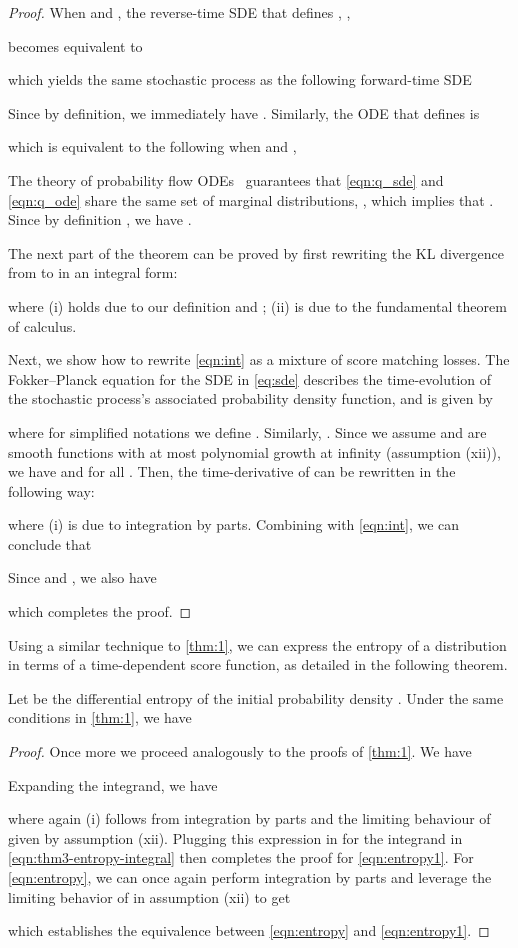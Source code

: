 \thm*
\begin{proof}
When  and , the reverse-time SDE that defines , \ie,

becomes equivalent to

which yields the same stochastic process as the following forward-time SDE

Since  by definition, we immediately have . Similarly, the ODE that defines  is

which is equivalent to the following when  and ,

The theory of probability flow ODEs~\cite{song2020score} guarantees that \cref{eqn:q_sde} and \cref{eqn:q_ode} share the same set of marginal distributions, , which implies that . Since by definition , we have .

The next part of the theorem can be proved by first rewriting the KL divergence from  to  in an integral form:

where (i) holds due to our definition  and ; (ii) is due to the fundamental theorem of calculus.

Next, we show how to rewrite \cref{eqn:int} as a mixture of score matching losses. 
The Fokker--Planck equation for the SDE in \cref{eq:sde} describes the time-evolution of the stochastic process's associated probability density function, and is given by

where for simplified notations we define . Similarly, . Since we assume  and  are smooth functions with at most polynomial growth at infinity (assumption (xii)), we have  and  for all . Then, the time-derivative of  can be rewritten in the following way:


where (i) is due to integration by parts. Combining with \cref{eqn:int}, we can conclude that

Since  and , we also have

which completes the proof.
\end{proof}



Using a similar technique to \cref{thm:1}, we can express the entropy of a distribution in terms of a time-dependent score function, as detailed in the following theorem.
\begin{theorem}\label{thm:entropy}
Let  be the differential entropy of the initial probability density . Under the same conditions in \cref{thm:1}, we have

\end{theorem}
\begin{proof}
Once more we proceed analogously to the proofs of \cref{thm:1}.
We have

Expanding the integrand, we have

where again (i) follows from integration by parts and the limiting behaviour of  given by assumption (xii).
Plugging this expression in for the integrand in \cref{eqn:thm3-entropy-integral} then completes the proof for \cref{eqn:entropy1}. For \cref{eqn:entropy}, we can once again perform integration by parts and leverage the limiting behavior of  in assumption (xii) to get

which establishes the equivalence between \cref{eqn:entropy} and \cref{eqn:entropy1}.
\end{proof}

